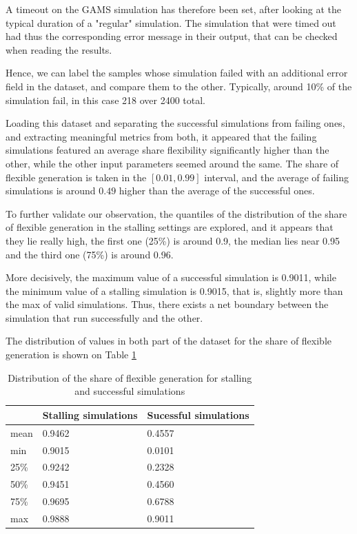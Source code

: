 A timeout on the GAMS simulation has therefore been set, after looking at the typical duration of a "regular" simulation. The simulation that were timed out had thus the corresponding error message in their output, that can be checked when reading the results.

Hence, we can label the samples whose simulation failed with an additional error field in the dataset, and compare them to the other. Typically, around 10\% of the simulation fail, in this case 218 over 2400 total.

Loading this dataset and separating the successful simulations from failing ones, and extracting meaningful metrics from both, it appeared that the failing simulations featured an average share flexibility significantly higher than the other, while the other input parameters seemed around the same. The share of flexible generation is taken in the $[0.01, 0.99]$ interval, and the average of failing simulations is around $0.49$ higher than the average of the successful ones.

To further validate our observation, the quantiles of the distribution of the share of flexible generation in the stalling settings are explored, and it appears that they lie really high, the first one (25\%) is around 0.9, the median lies near 0.95 and the third one (75\%) is around 0.96. 

More decisively, the maximum value of a successful simulation is 0.9011, while the minimum value of a stalling simulation is 0.9015, that is, slightly more than the max of valid simulations. Thus, there exists a net boundary between the simulation that run successfully and the other. 

The distribution of values in both part of the dataset for the share of flexible generation is shown on Table \ref{tab:stalling-simulations}

\begin{table}[h]
    \centering
    \begin{tabular}{|l|ll|}
        \hline
        & Stalling simulations & Sucessful simulations \\ \hline        
        mean & 0.9462 & 0.4557 \\
        min  & 0.9015 & 0.0101 \\
        25\% & 0.9242 & 0.2328 \\
        50\% & 0.9451 & 0.4560 \\
        75\% & 0.9695 & 0.6788 \\
        max  & 0.9888 & 0.9011 \\ \hline
    \end{tabular}
    \caption{Distribution of the share of flexible generation for stalling and successful simulations}
    \label{tab:stalling-simulations}
\end{table}

